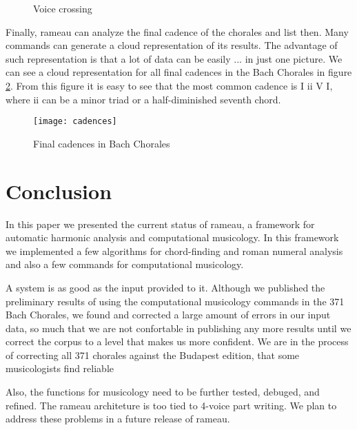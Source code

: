 \begin{figure}[!h]
  \centering
  \caption{Voice crossing}
  \label{fig:coral-003}
\end{figure}

Finally, rameau can analyze the final cadence of the chorales and list
then. Many commands can generate a cloud representation of its
results. The advantage of such representation is that a lot of data
can be easily ... in just one picture. We can see a cloud
representation for all final cadences in the Bach Chorales in figure
\ref{fig:cadences}. From this figure it is easy to see that the most
common cadence is I ii V I, where ii can be a minor triad or a
half-diminished seventh chord.

\begin{figure}
  \centering
  \texttt{[image: cadences]}
  \caption{Final cadences in Bach Chorales}
  \label{fig:cadences}
\end{figure}

\section{Conclusion}
\label{sec:conclusion}

In this paper we presented the current status of rameau, a framework
for automatic harmonic analysis and computational musicology. In this
framework we implemented a few algorithms for chord-finding and roman
numeral analysis and also a few commands for computational musicology.

A system is as good as the input provided to it. Although we published
the preliminary results of using the computational musicology commands
in the 371 Bach Chorales, we found and corrected a large amount of
errors in our input data, so much that we are not confortable in
publishing any more results until we correct the corpus to a level
that makes us more confident. We are in the process of correcting all
371 chorales against the Budapest edition, that some musicologists
find reliable


Also, the functions for musicology need to be further tested, debuged,
and refined. The rameau architeture is too tied to 4-voice part
writing. We plan to address these problems in a future release of
rameau.

